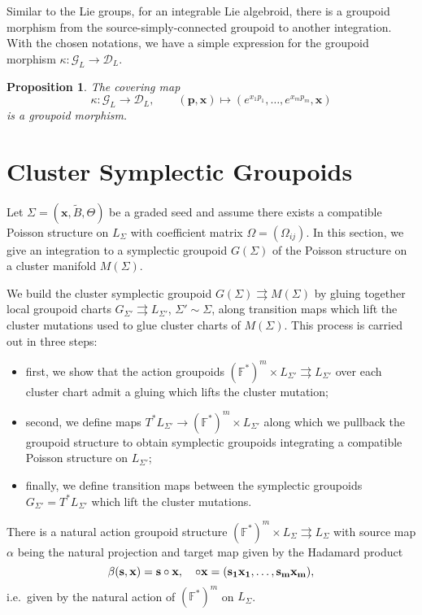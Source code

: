 \documentclass{amsart}
\newtheorem{proposition}[theorem]{Proposition}
\newcommand{\bfp}{\mathbf{p}}
\newcommand{\bfs}{\mathbf{s}}
\newcommand{\bfx}{\mathbf{x}}
\newcommand{\cG}{\mathcal{G}}
\newcommand{\cD}{\mathcal{D}}
\newcommand{\FF}{\mathbb{F}}
\begin{document}
Similar to the Lie groups, for an integrable Lie algebroid, there is a groupoid morphism from the source-simply-connected groupoid to another integration. With the chosen notations, we have a simple expression for the groupoid morphism $\kappa: \cG_L \to \cD_L$.

\begin{proposition}
The covering map
$$
	\kappa: \cG_L \to \cD_L, \qquad (\bfp, \bfx) \mapsto (e^{x_1p_1}, \ldots, e^{x_mp_m}, \bfx)
$$
is a groupoid morphism.
\end{proposition}


\section{Cluster Symplectic Groupoids}
Let $\Sigma=(\bfx,\tilde B,\Theta)$ be a graded seed and assume there exists a compatible Poisson structure on $L_\Sigma$ with coefficient matrix $\Omega=(\Omega_{ij})$.  
In this section, we give an integration to a symplectic groupoid $G(\Sigma)$ of the Poisson structure on a cluster manifold $M(\Sigma)$.  

We build the cluster symplectic groupoid $G(\Sigma)\rightrightarrows M(\Sigma)$ by gluing together local groupoid charts $G_{\Sigma'}\rightrightarrows L_{\Sigma'}$, $\Sigma'\sim\Sigma$, along transition maps which lift the cluster mutations used to glue cluster charts of $M(\Sigma)$.
This process is carried out in three steps:
\begin{itemize}
  \item first, we show that the action groupoids $(\FF^*)^m\times L_{\Sigma'}\rightrightarrows L_{\Sigma'}$ over each cluster chart admit a gluing which lifts the cluster mutation;
  \item second, we define maps $T^*L_{\Sigma'}\to(\FF^*)^m\times L_{\Sigma'}$ along which we pullback the groupoid structure to obtain symplectic groupoids integrating a compatible Poisson structure on $L_{\Sigma'}$;
  \item finally, we define transition maps between the symplectic groupoids $G_{\Sigma'}=T^*L_{\Sigma'}$ which lift the cluster mutations.
\end{itemize}

There is a natural action groupoid structure $(\FF^*)^m\times L_\Sigma\rightrightarrows L_\Sigma$ with source map $\alpha$ being the natural projection and target map given by the Hadamard product
\[\beta(\bfs,\bfx)=\bfs\circ\bfx,\quad \bf\circ\bfx=(s_1x_1,\ldots,s_mx_m),\]
i.e.\ given by the natural action of $(\FF^*)^m$ on $L_\Sigma$.
\end{document}
